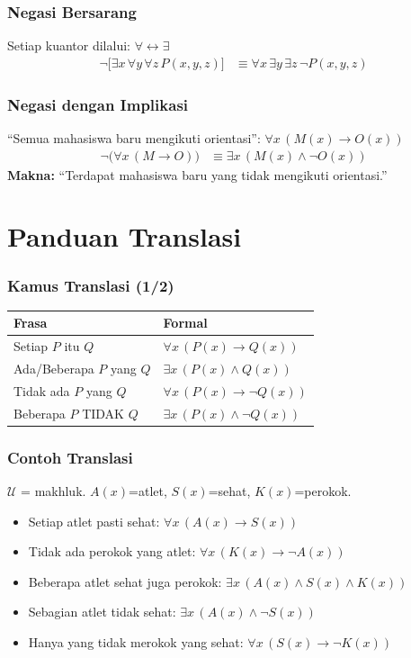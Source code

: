 \documentclass[handout]{beamer}
\theoremstyle{definition}
\theoremstyle{example}
\begin{document}
\begin{frame}
\frametitle{Negasi Bersarang}
Setiap kuantor dilalui: $\forall \leftrightarrow \exists$
\begin{align*}
\neg \big[ \exists x \, \forall y \, \forall z \, P(x,y,z) \big] &\equiv \forall x \, \exists y \, \exists z \, \neg P(x,y,z)
\end{align*}
\end{frame}

\begin{frame}
\frametitle{Negasi dengan Implikasi}
``Semua mahasiswa baru mengikuti orientasi'': $\forall x \, (M(x) \rightarrow O(x))$
\begin{align*}
\neg\big(\forall x \, (M \rightarrow O)\big) &\equiv \exists x \, (M(x) \land \neg O(x))
\end{align*}
\textbf{Makna:} ``Terdapat mahasiswa baru yang tidak mengikuti orientasi.''
\end{frame}

\section{Panduan Translasi}

\begin{frame}
\frametitle{Kamus Translasi (1/2)}
\begin{center}
\small
\begin{tabular}{|l|l|}
\hline
\textbf{Frasa} & \textbf{Formal} \\ \hline
Setiap $P$ itu $Q$ & $\forall x \, (P(x) \rightarrow Q(x))$ \\ \hline
Ada/Beberapa $P$ yang $Q$ & $\exists x \, (P(x) \land Q(x))$ \\ \hline
Tidak ada $P$ yang $Q$ & $\forall x \, (P(x) \rightarrow \neg Q(x))$ \\ \hline
Beberapa $P$ TIDAK $Q$ & $\exists x \, (P(x) \land \neg Q(x))$ \\ \hline
\end{tabular}
\end{center}
\end{frame}

\begin{frame}
\frametitle{Contoh Translasi}
$\mathcal{U}$ = makhluk. $A(x)$=atlet, $S(x)$=sehat, $K(x)$=perokok.
\begin{itemize}
  \item Setiap atlet pasti sehat: $\forall x \, (A(x) \rightarrow S(x))$
  \item Tidak ada perokok yang atlet: $\forall x \, (K(x) \rightarrow \neg A(x))$
  \item Beberapa atlet sehat juga perokok: $\exists x \, (A(x) \land S(x) \land K(x))$
  \item Sebagian atlet tidak sehat: $\exists x \, (A(x) \land \neg S(x))$
  \item Hanya yang tidak merokok yang sehat: $\forall x \, (S(x) \rightarrow \neg K(x))$
\end{itemize}
\end{frame}
\end{document}
